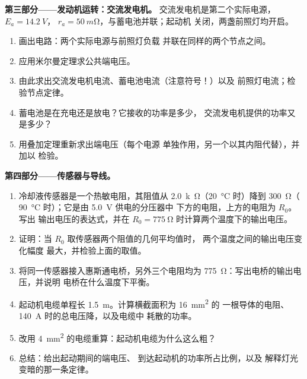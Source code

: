 \begin{problem}
\medskip
\noindent\textbf{第三部分——发动机运转：交流发电机。}
交流发电机是第二个实际电源，$E_a = \qty{14.2}{V}$，
$r_a = \qty{50}{m\ohm}$，与蓄电池并联；起动机
关闭，两盏前照灯均开启。
\begin{enumerate}[resume]
  \item 画出电路：两个实际电源与前照灯负载
        并联在同样的两个节点之间。
  \item 应用米尔曼定理求公共端电压。
  \item 由此求出交流发电机电流、蓄电池电流（注意符号！）以及
        前照灯电流；检验节点定律。
  \item 蓄电池是在充电还是放电？它接收的功率是多少，
        交流发电机提供的功率又是多少？
  \item 用叠加定理重新求出端电压（每个电源
        单独作用，另一个以其内阻代替），并加以
        检验。
\end{enumerate}

\medskip
\noindent\textbf{第四部分——传感器与导线。}
\begin{enumerate}[resume]
  \item 冷却液传感器是一个热敏电阻，其阻值从
        \qty{2.0}{k\ohm}（\qty{20}{\degreeCelsius} 时）降到 \qty{300}{\ohm}（
        \qty{90}{\degreeCelsius} 时）；它是由 \qty{5.0}{V} 供电的分压器中
        下方的电阻，上方的电阻为 $R_0$。写出
        输出电压的表达式，并在
        $R_0 = \qty{775}{\ohm}$ 时计算两个温度下的输出电压。
  \item 证明：当 $R_0$ 取传感器两个阻值的几何平均值时，
        两个温度之间的输出电压变化幅度
        最大，并检验上面的取值。
  \item 将同一传感器接入惠斯通电桥，另外三个电阻均为
        \qty{775}{\ohm}：写出电桥的输出电压，并说明
        电桥在什么温度下平衡。
  \item 起动机电缆单程长 \qty{1.5}{m}。计算横截面积为 \qty{16}{mm^2} 的
        一根导体的电阻、
        \qty{140}{A} 时的总电压降，以及电缆中
        耗散的功率。
  \item 改用 \qty{4}{mm^2} 的电缆重算：起动机电缆为什么这么粗？
  \item 总结：给出起动期间的端电压、
        到达起动机的功率所占比例，以及
        解释灯光变暗的那一条定律。
\end{enumerate}
\end{problem}
